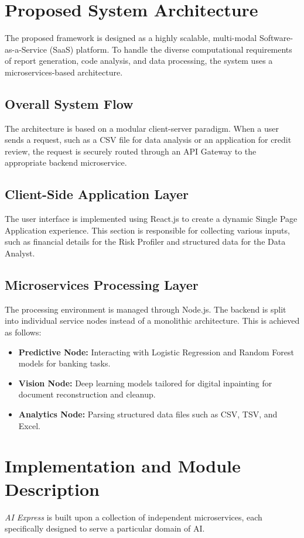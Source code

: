 \documentclass[conference]{IEEEtran}
\begin{document}
\section{Proposed System Architecture}
The proposed framework is designed as a highly scalable, multi-modal Software-as-a-Service (SaaS) platform. To handle the diverse computational requirements of report generation, code analysis, and data processing, the system uses a microservices-based architecture. 

\subsection{Overall System Flow}
The architecture is based on a modular client-server paradigm. When a user sends a request, such as a CSV file for data analysis or an application for credit review, the request is securely routed through an API Gateway to the appropriate backend microservice.

\subsection{Client-Side Application Layer}
The user interface is implemented using React.js to create a dynamic Single Page Application experience. This section is responsible for collecting various inputs, such as financial details for the Risk Profiler and structured data for the Data Analyst. 

\subsection{Microservices Processing Layer}
The processing environment is managed through Node.js. The backend is split into individual service nodes instead of a monolithic architecture. This is achieved as follows:
\begin{itemize}
    \item \textbf{Predictive Node:} Interacting with Logistic Regression and Random Forest models for banking tasks.
    \item \textbf{Vision Node:} Deep learning models tailored for digital inpainting for document reconstruction and cleanup.
    \item \textbf{Analytics Node:} Parsing structured data files such as CSV, TSV, and Excel.
\end{itemize}

\section{Implementation and Module Description}
\textit{AI Express} is built upon a collection of independent microservices, each specifically designed to serve a particular domain of AI.
\end{document}
